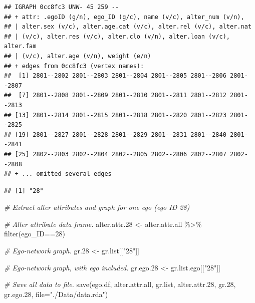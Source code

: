 \documentclass[
]{book}
\newenvironment{Shaded}{\begin{snugshade}}{\end{snugshade}}
\newcommand{\AttributeTok}[1]{\textcolor[rgb]{0.77,0.63,0.00}{#1}}
\newcommand{\CommentTok}[1]{\textcolor[rgb]{0.56,0.35,0.01}{\textit{#1}}}
\newcommand{\DecValTok}[1]{\textcolor[rgb]{0.00,0.00,0.81}{#1}}
\newcommand{\FloatTok}[1]{\textcolor[rgb]{0.00,0.00,0.81}{#1}}
\newcommand{\FunctionTok}[1]{\textcolor[rgb]{0.00,0.00,0.00}{#1}}
\newcommand{\NormalTok}[1]{#1}
\newcommand{\OtherTok}[1]{\textcolor[rgb]{0.56,0.35,0.01}{#1}}
\newcommand{\SpecialCharTok}[1]{\textcolor[rgb]{0.00,0.00,0.00}{#1}}
\newcommand{\StringTok}[1]{\textcolor[rgb]{0.31,0.60,0.02}{#1}}
\begin{document}
\begin{verbatim}
## IGRAPH 0cc8fc3 UNW- 45 259 -- 
## + attr: .egoID (g/n), ego_ID (g/c), name (v/c), alter_num (v/n),
## | alter.sex (v/c), alter.age.cat (v/c), alter.rel (v/c), alter.nat
## | (v/c), alter.res (v/c), alter.clo (v/n), alter.loan (v/c), alter.fam
## | (v/c), alter.age (v/n), weight (e/n)
## + edges from 0cc8fc3 (vertex names):
##  [1] 2801--2802 2801--2803 2801--2804 2801--2805 2801--2806 2801--2807
##  [7] 2801--2808 2801--2809 2801--2810 2801--2811 2801--2812 2801--2813
## [13] 2801--2814 2801--2815 2801--2818 2801--2820 2801--2823 2801--2825
## [19] 2801--2827 2801--2828 2801--2829 2801--2831 2801--2840 2801--2841
## [25] 2802--2803 2802--2804 2802--2805 2802--2806 2802--2807 2802--2808
## + ... omitted several edges
\end{verbatim}

\begin{Shaded}
\end{Shaded}

\begin{verbatim}
## [1] "28"
\end{verbatim}

\begin{Shaded}
\begin{Highlighting}[]
\CommentTok{\# Extract alter attributes and graph for one ego (ego ID 28)}

\CommentTok{\# Alter attribute data frame.}
\NormalTok{alter.attr}\FloatTok{.28} \OtherTok{\textless{}{-}}\NormalTok{ alter.attr.all }\SpecialCharTok{\%\textgreater{}\%}
  \FunctionTok{filter}\NormalTok{(ego\_ID}\SpecialCharTok{==}\DecValTok{28}\NormalTok{)}

\CommentTok{\# Ego{-}network graph.}
\NormalTok{gr}\FloatTok{.28} \OtherTok{\textless{}{-}}\NormalTok{ gr.list[[}\StringTok{"28"}\NormalTok{]]}

\CommentTok{\# Ego{-}network graph, with ego included.}
\NormalTok{gr.ego}\FloatTok{.28} \OtherTok{\textless{}{-}}\NormalTok{ gr.list.ego[[}\StringTok{"28"}\NormalTok{]]}

\CommentTok{\# Save all data to file.}
\FunctionTok{save}\NormalTok{(ego.df, alter.attr.all, gr.list, alter.attr}\FloatTok{.28}\NormalTok{, gr}\FloatTok{.28}\NormalTok{, gr.ego}\FloatTok{.28}\NormalTok{, }\AttributeTok{file=}\StringTok{"./Data/data.rda"}\NormalTok{)}
\end{Highlighting}
\end{Shaded}
\end{document}

